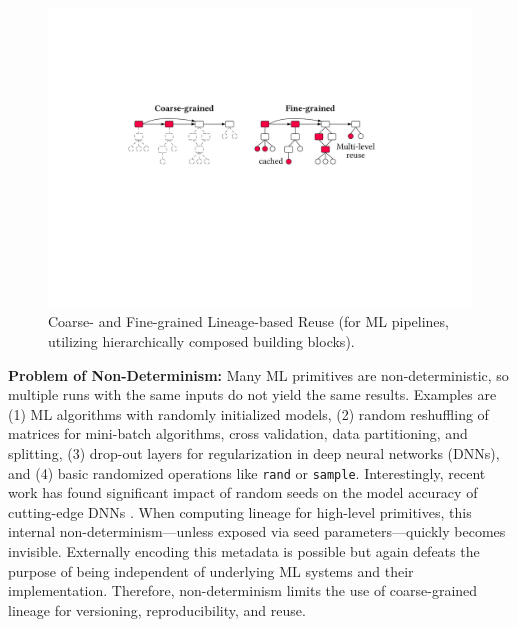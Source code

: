 \begin{figure}[!t]
	\centering
	\includegraphics[scale=0.317]{figures/coarse_vs_fine2}
	\vspace{-0.25cm}
	\caption{\label{fig:coarsefine}Coarse- and Fine-grained Lineage-based Reuse {\normalfont(for ML pipelines, utilizing hierarchically composed building blocks)}.}
	\vspace{-0.1cm}
\end{figure}

\textbf{Problem of Non-Determinism:} Many ML primitives are non-deterministic, so multiple runs with the same inputs do not yield the same results. Examples are (1) ML algorithms with randomly initialized models, (2) random reshuffling of matrices for mini-batch algorithms, cross validation, data partitioning, and splitting, (3) drop-out layers for regularization in deep neural networks (DNNs), and (4) basic randomized operations like \texttt{rand} or \texttt{sample}. Interestingly, recent work has found significant impact of random seeds on the model accuracy of cutting-edge DNNs \cite{abs-2002-06305}. When computing lineage for high-level primitives, this internal non-determinism---unless exposed via seed parameters---quickly becomes invisible. Externally encoding this metadata is possible but again defeats the purpose of being independent of underlying ML systems and their implementation. Therefore, non-determinism limits the use of coarse-grained lineage for versioning, reproducibility, and reuse.

